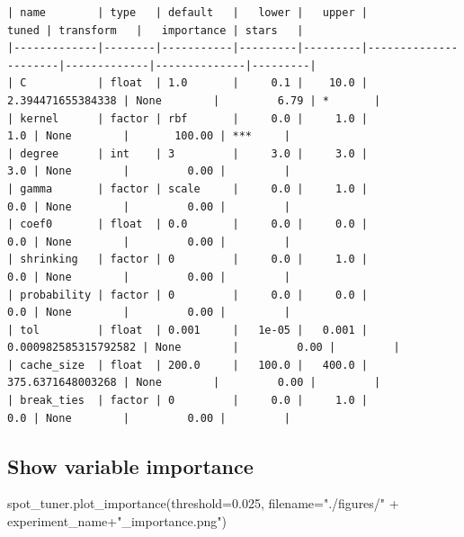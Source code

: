 \documentclass[
  letterpaper,
  DIV=11,
  numbers=noendperiod]{scrreprt}
\newenvironment{Shaded}{\begin{snugshade}}{\end{snugshade}}
\newcommand{\FloatTok}[1]{\textcolor[rgb]{0.68,0.00,0.00}{#1}}
\newcommand{\NormalTok}[1]{\textcolor[rgb]{0.00,0.23,0.31}{#1}}
\newcommand{\OperatorTok}[1]{\textcolor[rgb]{0.37,0.37,0.37}{#1}}
\newcommand{\StringTok}[1]{\textcolor[rgb]{0.13,0.47,0.30}{#1}}
\begin{document}
\begin{verbatim}
| name        | type   | default   |   lower |   upper |                tuned | transform   |   importance | stars   |
|-------------|--------|-----------|---------|---------|----------------------|-------------|--------------|---------|
| C           | float  | 1.0       |     0.1 |    10.0 |    2.394471655384338 | None        |         6.79 | *       |
| kernel      | factor | rbf       |     0.0 |     1.0 |                  1.0 | None        |       100.00 | ***     |
| degree      | int    | 3         |     3.0 |     3.0 |                  3.0 | None        |         0.00 |         |
| gamma       | factor | scale     |     0.0 |     1.0 |                  0.0 | None        |         0.00 |         |
| coef0       | float  | 0.0       |     0.0 |     0.0 |                  0.0 | None        |         0.00 |         |
| shrinking   | factor | 0         |     0.0 |     1.0 |                  0.0 | None        |         0.00 |         |
| probability | factor | 0         |     0.0 |     0.0 |                  0.0 | None        |         0.00 |         |
| tol         | float  | 0.001     |   1e-05 |   0.001 | 0.000982585315792582 | None        |         0.00 |         |
| cache_size  | float  | 200.0     |   100.0 |   400.0 |    375.6371648003268 | None        |         0.00 |         |
| break_ties  | factor | 0         |     0.0 |     1.0 |                  0.0 | None        |         0.00 |         |
\end{verbatim}

\hypertarget{show-variable-importance}{%
\subsection{Show variable importance}\label{show-variable-importance}}

\begin{Shaded}
\begin{Highlighting}[]
\NormalTok{spot\_tuner.plot\_importance(threshold}\OperatorTok{=}\FloatTok{0.025}\NormalTok{, filename}\OperatorTok{=}\StringTok{"./figures/"} \OperatorTok{+}\NormalTok{ experiment\_name}\OperatorTok{+}\StringTok{"\_importance.png"}\NormalTok{)}
\end{Highlighting}
\end{Shaded}
\end{document}
